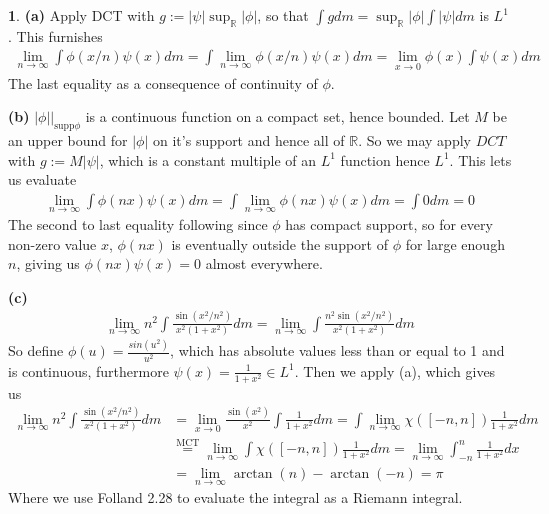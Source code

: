 \documentclass[10.5pt]{article}
\theoremstyle{definition}
\newtheorem{pb}{}
\newcommand{\abs}[1]{\lvert#1\rvert}
\begin{document}
\begin{pb}
    \textbf{(a)} Apply DCT with \(g := \abs{\psi}\sup_\mathbb{R}\abs{\phi}\), so that \(\int g dm = \sup_\mathbb{R}\abs{\phi} \int \abs{\psi} dm\) is \(L^1\).
    This furnishes
    \begin{align*}
        \lim_{n\to\infty}\int\phi(x/n)\psi(x)dm = \int \lim_{n\to\infty}\phi(x/n)\psi(x)dm = \lim_{x\to 0}\phi(x) \int\psi(x)dm
    \end{align*}
    The last equality as a consequence of continuity of \(\phi\).

    \textbf{(b)} \(\abs{\phi} \vert_{\text{supp}\phi}\) is a continuous function on a compact set, hence bounded. Let \(M\) be an upper bound for
    \(\abs{\phi}\) on it's support and hence all of \(\mathbb{R}\). So we may apply \(DCT\) with \(g := M\abs{\psi}\), which is a constant multiple of an \(L^1\)
    function hence \(L^1\). This lets us evaluate
    \begin{align*}
        \lim_{n\to\infty} \int \phi(nx)\psi(x)dm = \int \lim_{n\to\infty} \phi(nx)\psi(x)dm = \int 0 dm = 0
    \end{align*}
    The second to last equality following since \(\phi\) has compact support, so for every non-zero value \(x\), \(\phi(nx)\) is eventually outside the support of \(\phi\) for
    large enough \(n\), giving us \(\phi(nx)\psi(x) = 0\) almost everywhere.

    \textbf{(c)}
    \begin{align*}
        \lim_{n\to\infty} n^2 \int \frac{\sin(x^2/n^2)}{x^2(1+x^2)}dm = \lim_{n\to\infty}\int\frac{n^2\sin(x^2/n^2)}{x^2(1+x^2)}dm
    \end{align*}
    So define \(\phi(u) = \frac{sin(u^2)}{u^2}\), which has absolute values less than or equal to 1 and is continuous, furthermore \(\psi(x) = \frac{1}{1 + x^2} \in L^1\).
    Then we apply (a), which gives us
    \begin{align*}
        \lim_{n\to\infty} n^2 \int \frac{\sin(x^2/n^2)}{x^2(1+x^2)}dm &= \lim_{x\to 0}\frac{\sin(x^2)}{x^2} \int \frac{1}{1+x^2} dm 
        = \int \lim_{n \to \infty} \chi([-n,n])\frac{1}{1+x^2}dm \\
        &\overset{\text{MCT}}{=} \lim_{n \to \infty}\int \chi([-n,n])\frac{1}{1+x^2}dm = \lim_{n\to\infty}\int_{-n}^n \frac{1}{1+x^2} dx \\
        &= \lim_{n\to \infty} \arctan(n) - \arctan(-n) = \pi
    \end{align*}
    Where we use Folland 2.28 to evaluate the integral as a Riemann integral.


\end{pb}
\end{document}
